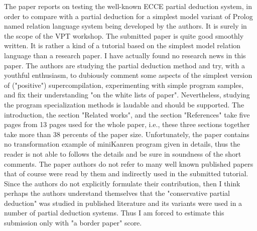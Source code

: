 The paper reports on testing the well-known ECCE partial deduction system, in order to compare with a partial deduction for a simplest model variant of Prolog named relation language system being developed by the authors.
It is surely in the scope of the VPT workshop.
The submitted paper is quite good smoothly written. It is rather a kind of a tutorial based on the simplest model relation language than a research paper. I have actually found no research news in this paper. The authors are studying the partial deduction method and try, with a youthful enthusiasm, to dubiously comment some aspects of the simplest version of ("positive") supercompilation, experimenting with simple program samples, and fix their understanding "on the white lists of paper". Nevertheless, studying the program specialization methods is laudable and should be supported.
The introduction, the section "Related works", and the section "References" take five pages from 13 pages used for the whole paper, i.e., these three sections together take more than 38 percents of the paper size.
Unfortunately, the paper contains no transformation example of miniKanren program given in details, thus the reader is not able to follows the details and be sure in soundness of the short comments.
The paper authors do not refer to many well known published papers that of course were read by them and indirectly used in the submitted tutorial. Since the authors do not explicitly formulate their contribution, then I think perhaps the authors understand themselves that the "conservative partial deduction" was studied in published literature and its variants were used in a number of partial deduction systems.
Thus I am forced to estimate this submission only with "a border paper" score.


